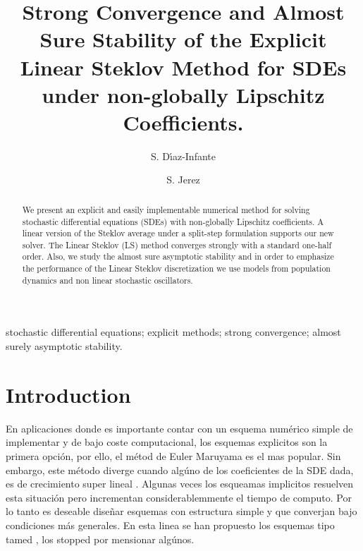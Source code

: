 \documentclass[sort&compress, preprint]{elsarticle}
\theoremstyle{definition}
\theoremstyle{plain}%
\theoremstyle{remark}
\newcommand{\SM}{LS\xspace}
\begin{document}
	\begin{frontmatter}
		\title{
				Strong Convergence and Almost Sure Stability of the Explicit Linear Steklov Method
				for SDEs under non-globally Lipschitz Coefficients.
		}%
		\author[sj]{S. D\'{\i}az-Infante}
		\author[sj]{S. Jerez}
		\address[sj]{Split Step Linear Steklov Method 
		Department of Applied Mathematics, CIMAT, Guanajuato, Gto., Mexico,
		36240.
		}
	\begin{abstract}
		We present an explicit and easily implementable numerical method for
		solving stochastic differential equations (SDEs) with non-globally Lipschitz
		coefficients. A linear version of the Steklov average under a split-step formulation supports our new solver.
		The Linear Steklov (\SM) method converges strongly with a standard 
		one-half order.  Also, we study the almost sure asymptotic stability and in  order to emphasize the 
		performance of the Linear Steklov discretization we use models from population dynamics 
		and non linear stochastic oscillators.
	\end{abstract}
	\begin{keyword}
		stochastic differential equations;
		explicit methods; strong convergence; almost surely asymptotic stability.
	\end{keyword}
	\end{frontmatter}
	\pagebreak
	\tableofcontents
	\pagebreak
	

\section{Introduction} 

En aplicaciones donde es importante contar con un esquema numérico  simple de implementar y de bajo coste 
computacional, los esquemas explicitos son la primera opción, por ello, el métod de Euler Maruyama es el mas popular.
Sin embargo, este método diverge cuando algúno de los coeficientes de la SDE dada, es de crecimiento super lineal
\cite{Hutzenthaler2009, Hutzenthaler2010, Hutzenthaler2012b}. Algunas veces los esqueamas implicitos resuelven esta
situación pero incrementan considerablemmente el tiempo de computo. Por lo tanto es deseable diseñar esquemas con 
estructura simple y que converjan bajo condiciones más generales. En esta linea se han propuesto los esquemas tipo
tamed \cite{Hutzenthaler2012c, Wang2011}, los stopped \cite{Liu2013a} por mensionar algúnos.
\end{document}
